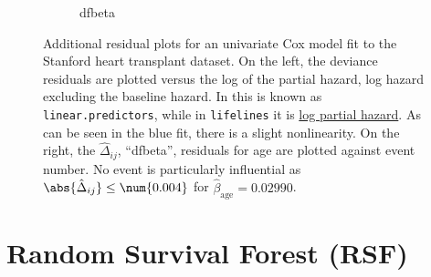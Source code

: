 \begin{figure}[H]
\begin{subfigure}[c]{0.48\textwidth}
  \caption{dfbeta}
  \label{fig:cox:outliers:dfbeta}
  \end{subfigure}
\caption{
Additional residual plots for
an univariate Cox model fit to the Stanford heart transplant dataset.
On the left, the deviance residuals are plotted versus the
log of the partial hazard, \ie log hazard excluding the baseline hazard.
In \R this is known as \texttt{linear.predictors}, while in \texttt{lifelines} it is
\href{https://lifelines.readthedocs.io/en/latest/fitters/regression/CoxPHFitter.html\#lifelines.fitters.coxph_fitter.SemiParametricPHFitter.predict_log_partial_hazard}{log partial hazard}.
As can be seen in the blue fit, there is a slight nonlinearity.
On the right, the $\hat{\Delta}_{ij}$, \ie ``dfbeta'', residuals for age
are plotted against event number.
No event is particularly influential as $\abs{\hat{\Delta}_{ij}} \leq \num{0.004}$
for $\hat{\beta}_{\text{age}} = \num{0.02990}$.
}
\label{fig:cox:outliers}
\end{figure}

\section{Random Survival Forest (RSF)}
\label{survival:RSF}
